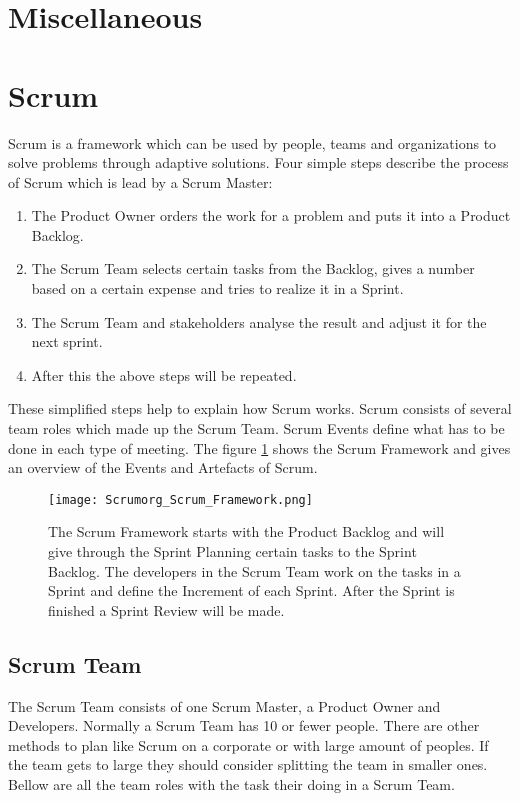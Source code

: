 \section{Miscellaneous}

\section{Scrum} \label{sec:Scrum}
Scrum is a framework which can be used by people, teams and organizations to solve problems through adaptive solutions. Four simple steps describe the process of Scrum which is lead by a Scrum Master:
\begin{enumerate}
    \item The Product Owner orders the work for a problem and puts it into a Product Backlog.
    \item The Scrum Team selects certain tasks from the Backlog, gives a number based on a certain expense and tries to realize it in a Sprint.
    \item The Scrum Team and stakeholders analyse the result and adjust it for the next sprint.
    \item After this the above steps will be repeated.
\end{enumerate}

These simplified steps help to explain how Scrum works. Scrum consists of several team roles which made up the Scrum Team. Scrum Events define what has to be done in each type of meeting. The figure \ref{fig:Scrum Framework} shows the Scrum Framework and gives an overview of the Events and Artefacts of Scrum. \cite{scrum_guide}


\begin{figure}[H]
    \centering
    \texttt{[image: Scrumorg\_Scrum\_Framework.png]}
    \caption{The Scrum Framework starts with the Product Backlog and will give through the Sprint Planning certain tasks to the Sprint Backlog. The developers in the Scrum Team work on the tasks in a Sprint and define the Increment of each Sprint. After the Sprint is finished a Sprint Review will be made. \cite{scrum_guide}}
    \label{fig:Scrum Framework}
\end{figure}


\subsection{Scrum Team} \label{sec:Scrum Team}
The Scrum Team consists of one Scrum Master, a Product Owner and Developers. Normally a Scrum Team has 10 or fewer people. There are other methods to plan like Scrum on a corporate or with large amount of peoples. If the team gets to large they should consider splitting the team in smaller ones. Bellow are all the team roles with the task their doing in a Scrum Team. \cite{scrum_guide}

